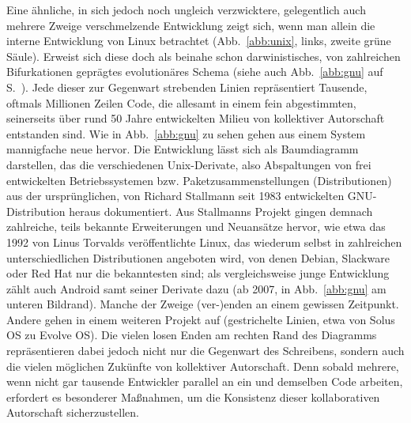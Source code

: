 \documentclass[a4paper,11pt]{article}
\begin{document}
Eine ähnliche, in sich jedoch noch ungleich verzwicktere, gelegentlich auch mehrere Zweige verschmelzende Entwicklung zeigt sich, wenn man allein die interne Entwicklung von Linux betrachtet (Abb.~\ref{abb:unix}, links, zweite grüne Säule). Erweist sich diese doch als beinahe schon darwinistisches, von zahlreichen Bifurkationen geprägtes evolutionäres Schema  (siehe auch Abb.~\ref{abb:gnu} auf S.~\pageref{toc:gnu}). Jede dieser zur Gegenwart strebenden Linien repräsentiert Tausende, oftmals Millionen Zeilen Code, die allesamt in einem fein abgestimmten, seinerseits über rund 50 Jahre entwickelten Milieu von kollektiver Autorschaft entstanden sind. Wie in Abb.~\ref{abb:gnu} zu sehen gehen aus einem System mannigfache neue hervor. Die Entwicklung lässt sich als Baumdiagramm darstellen, das die verschiedenen Unix-Derivate, also Abspaltungen von frei entwickelten Betriebssystemen bzw. Paketzusammenstellungen (Distributionen) aus der ursprünglichen, von Richard Stallmann seit 1983 entwickelten GNU-Distribution heraus dokumentiert. Aus Stallmanns Projekt gingen demnach zahlreiche, teils bekannte Erweiterungen und Neuansätze hervor, wie etwa das 1992 von Linus Torvalds veröffentlichte Linux, das wiederum selbst in zahlreichen unterschiedlichen Distributionen angeboten wird, von denen Debian, Slackware oder Red Hat nur die bekanntesten sind; als vergleichsweise junge Entwicklung zählt auch Android samt seiner Derivate dazu (ab 2007, in Abb.~\ref{abb:gnu} am unteren Bildrand). Manche der Zweige (ver-)enden an einem gewissen Zeitpunkt. Andere gehen in einem weiteren Projekt auf (gestrichelte Linien, etwa von Solus OS zu Evolve OS). Die vielen losen Enden am rechten Rand des Diagramms repräsentieren dabei jedoch nicht nur die Gegenwart des Schreibens, sondern auch die vielen möglichen Zukünfte von kollektiver Autorschaft. Denn sobald mehrere, wenn nicht gar tausende Entwickler parallel an ein und demselben Code arbeiten, erfordert es besonderer Maßnahmen, um die Konsistenz dieser kollaborativen Autorschaft sicherzustellen. 
\end{document}
